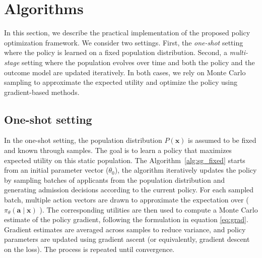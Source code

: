 \documentclass[acmlarge]{acmart-ecaf}
\newcommand {\Pfeat} {\mathbf{x}}
\newcommand {\pol} {\pi}
\newcommand {\Pact} {\mathbf{a}}
\begin{document}
\section{Algorithms} \label{app:algo}

In this section, we describe the practical implementation of the proposed policy optimization framework. We consider two settings. First, the \emph{one-shot} setting where the policy is learned on a fixed population distribution. Second, a \emph{multi-stage} setting where the population evolves over time and both the policy and the outcome model are updated iteratively. In both cases, we rely on Monte Carlo sampling to approximate the expected utility and optimize the policy using gradient-based methods.

\subsection{One-shot setting}

In the one-shot setting, the population distribution $P(\Pfeat)$ is assumed to be fixed and known through samples. The goal is to learn a policy that maximizes expected utility on this static population. The Algorithm~\ref{alg:sg_fixed} starts from an initial parameter vector ($\theta_0$), the algorithm iteratively updates the policy by sampling batches of applicants from the population distribution and generating admission decisions according to the current policy. For each sampled batch, multiple action vectors are drawn to approximate the expectation over ( $\pol_\theta(\Pact \mid \Pfeat)$ ). The corresponding utilities are then used to compute a Monte Carlo estimate of the policy gradient, following the formulation in equation \ref{eq:grad}. Gradient estimates are averaged across samples to reduce variance, and policy parameters are updated using gradient ascent (or equivalently, gradient descent on the loss). The process is repeated until convergence.
\end{document}
